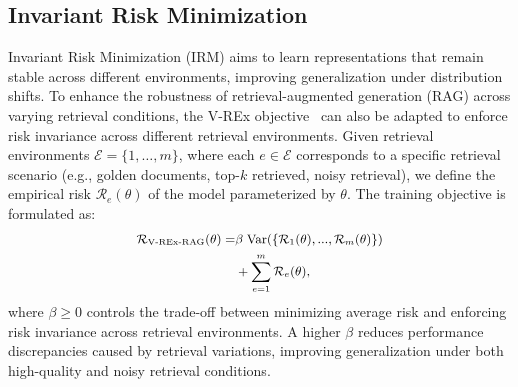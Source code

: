 \subsection{Invariant Risk Minimization}
Invariant Risk Minimization (IRM) aims to learn representations that remain stable across different environments, improving generalization under distribution shifts. To enhance the robustness of retrieval-augmented generation (RAG) across varying retrieval conditions, the V-REx objective~\cite{DBLP:conf/icml/KruegerCJ0BZPC21} can also be adapted to enforce risk invariance across different retrieval environments. Given retrieval environments $\mathcal{E} = \{1, \dots, m\}$, where each $e \in \mathcal{E}$ corresponds to a specific retrieval scenario (e.g., golden documents, top-$k$ retrieved, noisy retrieval), we define the empirical risk $\mathcal{R}_e(\theta)$ of the model parameterized by $\theta$. The training objective is formulated as:
\begin{equation}
\small
\setlength\abovedisplayskip{0.2cm}
\setlength\belowdisplayskip{0.2cm}
\begin{aligned}
\mathcal{R}_\textrm{V-REx-RAG}(\theta) = &\beta \; \mathrm{Var}(\{\mathcal{R}_1(\theta), ..., \mathcal{R}_m(\theta)\})\\ & + \sum^m_{e=1} \mathcal{R}_e(\theta),
\end{aligned}
\end{equation}
where $\beta \geq 0$ controls the trade-off between minimizing average risk and enforcing risk invariance across retrieval environments. A higher $\beta$ reduces performance discrepancies caused by retrieval variations, improving generalization under both high-quality and noisy retrieval conditions.